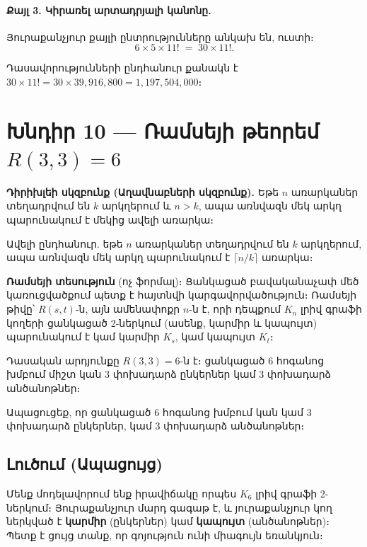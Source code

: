 \documentclass[12pt, a4paper]{article}
\begin{document}
\paragraph{Քայլ 3. Կիրառել արտադրյալի կանոնը.}
Յուրաքանչյուր քայլի ընտրությունները անկախ են, ուստի։
\[
  6 \times 5 \times 11!
  \;=\; 30 \times 11!.
\]

\begin{answerbox}
\centering
Դասավորությունների ընդհանուր քանակն է $\boxed{30 \times 11! = 30 \times 39{,}916{,}800 = 1{,}197{,}504{,}000}$։
\end{answerbox}

\newpage
\section{Խնդիր 10 — Ռամսեյի թեորեմ \texorpdfstring{$R(3,3) = 6$}{R(3,3) = 6}}

\begin{theorybox}
\textbf{Դիրիխլեի սկզբունք (Աղավնաբների սկզբունք).}\;
Եթե $n$ առարկաներ տեղադրվում են $k$ արկղերում և $n > k$, ապա առնվազն
մեկ արկղ պարունակում է մեկից ավելի առարկա։

Ավելի ընդհանուր. եթե $n$ առարկաներ տեղադրվում են $k$ արկղերում, ապա առնվազն
մեկ արկղ պարունակում է $\lceil n/k \rceil$ առարկա։

\medskip
\textbf{Ռամսեյի տեսություն} (ոչ ֆորմալ)։
Ցանկացած բավականաչափ մեծ կառուցվածքում պետք է հայտնվի կարգավորվածություն։
Ռամսեյի թիվը՝ $R(s,t)$-ն, այն ամենափոքր $n$-ն է, որի դեպքում $K_n$ լրիվ գրաֆի
կողերի ցանկացած 2-ներկում (ասենք, կարմիր և կապույտ) պարունակում է
կամ կարմիր $K_s$, կամ կապույտ $K_t$։

\medskip
Դասական արդյունքը $R(3,3) = 6$-ն է։ ցանկացած 6 հոգանոց խմբում միշտ կան
3 փոխադարձ ընկերներ կամ 3 փոխադարձ անծանոթներ։
\end{theorybox}

\begin{problembox}
Ապացուցեք, որ ցանկացած 6 հոգանոց խմբում կան կամ 3 փոխադարձ ընկերներ,
կամ 3 փոխադարձ անծանոթներ։
\end{problembox}

\subsection*{Լուծում (Ապացույց)}

Մենք մոդելավորում ենք իրավիճակը որպես $K_6$ լրիվ գրաֆի 2-ներկում։
Յուրաքանչյուր մարդ գագաթ է, և յուրաքանչյուր կող ներկված է \textbf{կարմիր}
(ընկերներ) կամ \textbf{կապույտ} (անծանոթներ)։
Պետք է ցույց տանք, որ գոյություն ունի միագույն եռանկյուն։
\end{document}
